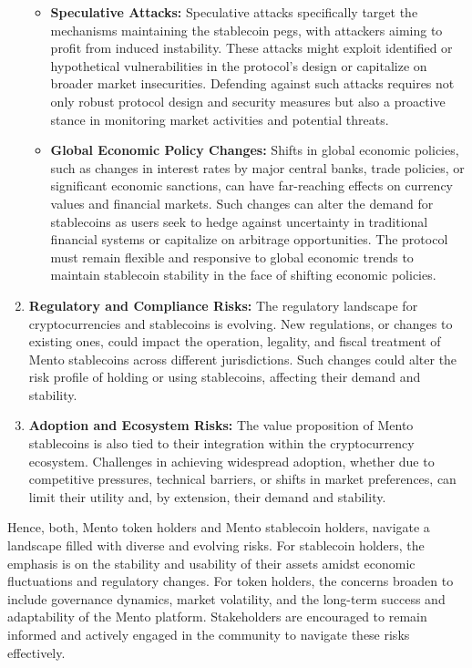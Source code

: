 \documentclass[a4paper]{article}
\theoremstyle{definition}
\begin{document}
\begin{appendices}
\begin{enumerate}
\begin{itemize}
        \item \textbf{Speculative Attacks:} Speculative attacks specifically target the mechanisms maintaining the stablecoin pegs, with attackers aiming to profit from induced instability. These attacks might exploit identified or hypothetical vulnerabilities in the protocol's design or capitalize on broader market insecurities. Defending against such attacks requires not only robust protocol design and security measures but also a proactive stance in monitoring market activities and potential threats.
    
        \item \textbf{Global Economic Policy Changes:} Shifts in global economic policies, such as changes in interest rates by major central banks, trade policies, or significant economic sanctions, can have far-reaching effects on currency values and financial markets. Such changes can alter the demand for stablecoins as users seek to hedge against uncertainty in traditional financial systems or capitalize on arbitrage opportunities. The protocol must remain flexible and responsive to global economic trends to maintain stablecoin stability in the face of shifting economic policies.
        \end{itemize}
    
        \item \textbf{Regulatory and Compliance Risks:} The regulatory landscape for cryptocurrencies and stablecoins is evolving. New regulations, or changes to existing ones, could impact the operation, legality, and fiscal treatment of Mento stablecoins across different jurisdictions. Such changes could alter the risk profile of holding or using stablecoins, affecting their demand and stability.
    
        \item \textbf{Adoption and Ecosystem Risks:} The value proposition of Mento stablecoins is also tied to their integration within the cryptocurrency ecosystem. Challenges in achieving widespread adoption, whether due to competitive pressures, technical barriers, or shifts in market preferences, can limit their utility and, by extension, their demand and stability.
    
    \end{enumerate}

Hence, both, Mento token holders and Mento stablecoin holders, navigate a landscape filled with diverse and evolving risks. For stablecoin holders, the emphasis is on the stability and usability of their assets amidst economic fluctuations and regulatory changes. For token holders, the concerns broaden to include governance dynamics, market volatility, and the long-term success and adaptability of the Mento platform. Stakeholders are encouraged to remain informed and actively engaged in the community to navigate these risks effectively.


\end{appendices}
\end{document}
